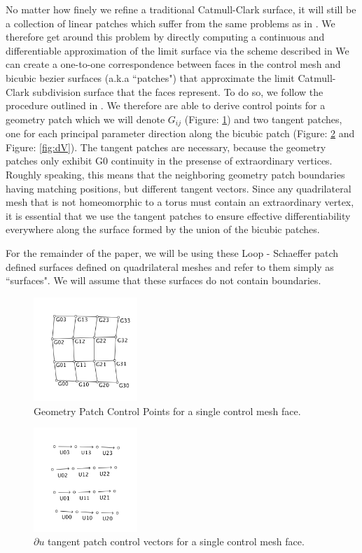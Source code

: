 \documentclass[12pt, letterpaper]{article}
\begin{document}
		No matter how finely we refine a traditional Catmull-Clark surface, it will still be a collection of linear patches which suffer from the same problems as 
		in \cite{Eisemann08}.  We therefore get around this problem by directly computing a continuous and differentiable approximation of the limit surface
		via the scheme described in \cite{Loop}
		We can create a one-to-one correspondence between faces in the control mesh and bicubic bezier surfaces (a.k.a ``patches") that approximate the 
		limit Catmull-Clark subdivision surface that the faces represent.
		To do so, we follow the procedure outlined in \cite{Loop}.
		We therefore are able to derive control points for a geometry patch which we will denote $G_{ij}$ (Figure: \ref{fig:G}) and two tangent patches, 
		one for each principal parameter direction along the bicubic patch (Figure: \ref{fig:dU} and Figure: \ref{fig:dV}).
		The tangent patches are necessary, because the geometry patches only exhibit G0 continuity in the presense of extraordinary vertices. Roughly speaking, this means that the neighboring geometry patch boundaries having matching positions, but different tangent vectors.
		Since any quadrilateral mesh that is not homeomorphic to a torus must contain an extraordinary vertex,
		it is essential that we use the tangent patches to ensure effective differentiability everywhere along the surface formed by the union of the bicubic patches.
		
		For the remainder of the paper, we will be using these Loop - Schaeffer patch defined surfaces defined on quadrilateral meshes and refer to them simply as ``surfaces".
		We will assume that these surfaces do not contain boundaries.

		\begin{figure}[h]
		\centering
		\includegraphics[width=0.35\textwidth]{GeometryPatchControlPoints}
		\caption{Geometry Patch Control Points for a single control mesh face.}
		\label{fig:G}
		\end{figure}

		\begin{figure}[h]
		\centering
		\includegraphics[width=0.35\textwidth]{duPatch}
		\caption{$\partial u$ tangent patch control vectors for a single control mesh face.}
		\label{fig:dU}
		\end{figure}
\end{document}
